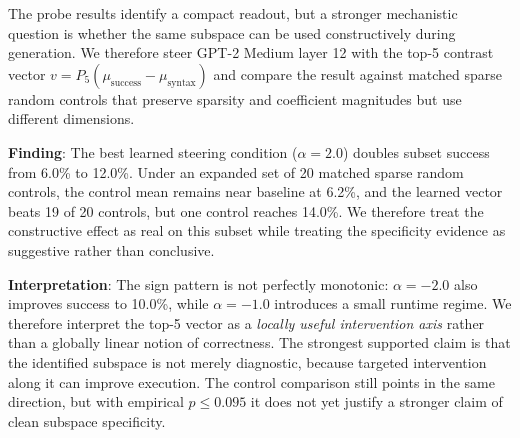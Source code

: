 \documentclass[preprint,12pt,authoryear]{elsarticle}
\begin{document}
The probe results identify a compact readout, but a stronger mechanistic question is whether the same subspace can be used constructively during generation. We therefore steer GPT-2 Medium layer 12 with the top-5 contrast vector $v=P_5(\mu_{\mathrm{success}}-\mu_{\mathrm{syntax}})$ and compare the result against matched sparse random controls that preserve sparsity and coefficient magnitudes but use different dimensions.

\begin{table}[t]
\centering
\caption{Layer-12 Steering and Matched-Control Pilot}
\label{tab:steering_controls}
\scriptsize
{}
\end{table}

\textbf{Finding}: The best learned steering condition ($\alpha=2.0$) doubles subset success from 6.0\% to 12.0\%. Under an expanded set of 20 matched sparse random controls, the control mean remains near baseline at 6.2\%, and the learned vector beats 19 of 20 controls, but one control reaches 14.0\%. We therefore treat the constructive effect as real on this subset while treating the specificity evidence as suggestive rather than conclusive.

\textbf{Interpretation}: The sign pattern is not perfectly monotonic: $\alpha=-2.0$ also improves success to 10.0\%, while $\alpha=-1.0$ introduces a small runtime regime. We therefore interpret the top-5 vector as a \emph{locally useful intervention axis} rather than a globally linear notion of correctness. The strongest supported claim is that the identified subspace is not merely diagnostic, because targeted intervention along it can improve execution. The control comparison still points in the same direction, but with empirical $p \le 0.095$ it does not yet justify a stronger claim of clean subspace specificity.
\end{document}
